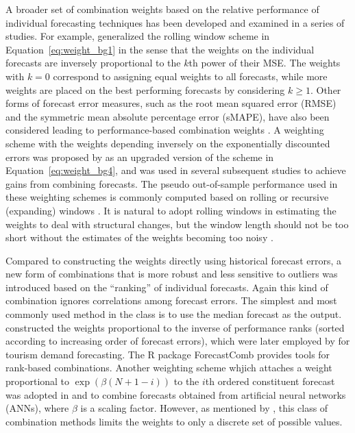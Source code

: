 \documentclass[11pt]{article}
\newcommand{\pkg}[1]{{\normalfont\fontseries{b}\selectfont #1}}
\let\proglang=\textsf
\begin{document}
A broader set of combination weights based on the relative performance of individual forecasting techniques has been developed and examined in a series of studies. For example, \citet{Stock1998-np} generalized the rolling window scheme in Equation~\eqref{eq:weight_bg1} in the sense that the weights on the individual forecasts are inversely proportional to the $k$th power of their MSE. The weights with $k = 0$ correspond to assigning equal weights to all forecasts, while more weights are placed on the best performing forecasts by considering $k \geq 1$. Other forms of forecast error measures, such as the root mean squared error (RMSE) and the symmetric mean absolute percentage error (sMAPE), have also been considered leading to performance-based combination weights \citep[e.g.,][]{Nowotarski2014-ev,Pawlikowski2020-hm}. A weighting scheme with the weights depending inversely on the exponentially discounted errors was proposed by \citet{Stock2004-rq} as an upgraded version of the scheme in Equation~\eqref{eq:weight_bg4}, and was used in several subsequent studies \citep[e.g.,][]{Clark2010-jx,Genre2013-ut} to achieve gains from combining forecasts. The pseudo out-of-sample performance used in these weighting schemes is commonly computed based on rolling or recursive (expanding) windows \citep[e.g.,][]{Stock1998-np,Clark2010-jx,Genre2013-ut}. It is natural to adopt rolling windows in estimating the weights to deal with structural changes, but the window length should not be too short without the estimates of the weights becoming too noisy \citep{Baumeister2015-ft}.

Compared to constructing the weights directly using historical forecast errors, a new form of combinations that is more robust and less sensitive to outliers was introduced based on the ``ranking'' of individual forecasts. Again this kind of combination ignores correlations among forecast errors. The simplest and most commonly used method in the class is to use the median forecast as the output. \citet{Aiolfi2006-rh} constructed the weights proportional to the inverse of performance ranks (sorted according to increasing order of forecast errors), which were later employed by \citet{Andrawis2011-kb} for tourism demand forecasting. The \proglang{R} package \pkg{ForecastComb} \citep{rForecastComb} provides tools for rank-based combinations. Another weighting scheme whjich attaches a weight proportional to $\exp(\beta(N+1-i))$ to the $i$th ordered constituent forecast was adopted in \citet{Yao2008-or} and \citet{Donate2013-lq} to combine forecasts obtained from artificial neural networks (ANNs), where $\beta$ is a scaling factor. However, as mentioned by \citet{Andrawis2011-kb}, this class of combination methods limits the weights to only a discrete set of possible values.
\end{document}

